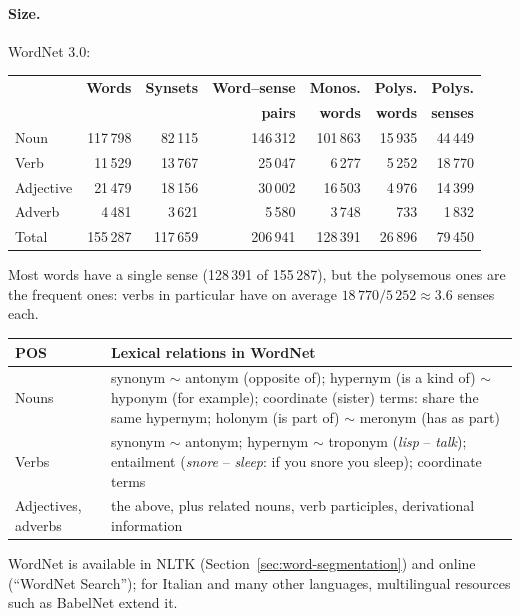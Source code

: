 \paragraph{Size.} WordNet 3.0:
\begin{center}
\footnotesize
\setlength{\tabcolsep}{4pt}
\begin{tabular}{@{}l rrr @{\hspace{0.6cm}} rrr@{}}
\toprule
 & \textbf{Words} & \textbf{Synsets} & \textbf{Word--sense} & \textbf{Monos.} & \textbf{Polys.} & \textbf{Polys.} \\
 &  &  & \textbf{pairs} & \textbf{words} & \textbf{words} & \textbf{senses} \\
\midrule
Noun      & 117\,798 & 82\,115  & 146\,312 & 101\,863 & 15\,935 & 44\,449 \\
Verb      & 11\,529  & 13\,767  & 25\,047  & 6\,277   & 5\,252  & 18\,770 \\
Adjective & 21\,479  & 18\,156  & 30\,002  & 16\,503  & 4\,976  & 14\,399 \\
Adverb    & 4\,481   & 3\,621   & 5\,580   & 3\,748   & 733     & 1\,832 \\
\midrule
Total     & 155\,287 & 117\,659 & 206\,941 & 128\,391 & 26\,896 & 79\,450 \\
\bottomrule
\end{tabular}
\end{center}
Most words have a single sense (128\,391 of 155\,287), but the polysemous ones are the
frequent ones: verbs in particular have on average $18\,770/5\,252 \approx 3.6$ senses
each.

\begin{center}
\small
\begin{tabularx}{\linewidth}{@{}l >{\raggedright\arraybackslash}X@{}}
\toprule
\textbf{POS} & \textbf{Lexical relations in WordNet} \\
\midrule
Nouns & synonym $\sim$ antonym (opposite of); hypernym (is a kind of) $\sim$ hyponym (for
  example); coordinate (sister) terms: share the same hypernym; holonym (is part of)
  $\sim$ meronym (has as part) \\
Verbs & synonym $\sim$ antonym; hypernym $\sim$ troponym (\emph{lisp} -- \emph{talk});
  entailment (\emph{snore} -- \emph{sleep}: if you snore you sleep); coordinate terms \\
Adjectives, adverbs & the above, plus related nouns, verb participles, derivational
  information \\
\bottomrule
\end{tabularx}
\end{center}

WordNet is available in NLTK (Section~\ref{sec:word-segmentation}) and online
(``WordNet Search''); for Italian and many other languages, multilingual resources such as
BabelNet extend it.

